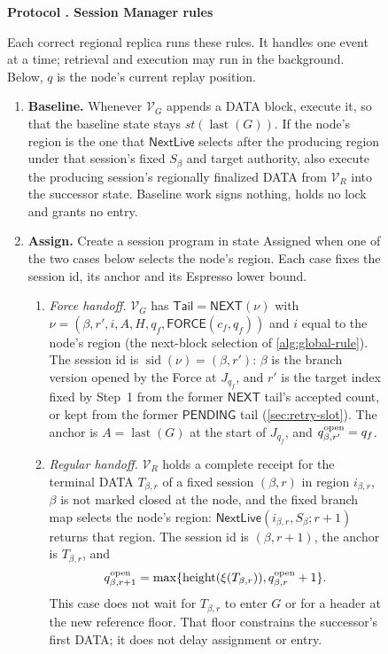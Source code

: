\documentclass[11pt,a4paper]{article}
\newcommand{\tagg}[1]{\ensuremath{\mathsf{#1}}}
\newcounter{protocol}
\newenvironment{protocol}[3][htbp]{\begin{figure}[#1]\refstepcounter{protocol}\label{#2}
\begin{mdframed}[linewidth=.6pt,skipabove=0pt,skipbelow=0pt,
innertopmargin=7pt,innerbottommargin=7pt]\small
\textbf{Protocol \theprotocol. #3}\par\smallskip}{\end{mdframed}\end{figure}}
\begin{document}
\begin{protocol}[H]{alg:rotation}{Session Manager rules}
Each correct regional replica runs these rules. It handles one event at
a time; retrieval and execution may run in the background. Below, $q$
is the node's current replay position.
\begin{enumerate}[label=\textbf{\arabic*)},itemsep=3pt]
\item \textbf{Baseline.} Whenever $\mathcal V_G$ appends a DATA block,
execute it, so that the baseline state stays
$\mathit{st}(\operatorname{last}(G))$. If the node's region is the one
that $\tagg{NextLive}$ selects after the producing region under that
session's fixed $S_\beta$ and target authority,
also execute the producing session's regionally finalized DATA from
$\mathcal V_R$ into the successor state. Baseline work signs nothing,
holds no lock and grants no entry.
\item \textbf{Assign.} Create a session program in state Assigned when
one of the two cases below selects the node's region. Each case fixes
the session id, its anchor and its Espresso lower bound.
 \begin{enumerate}[label=(\alph*),itemsep=2pt]
 \item \emph{Force handoff.} $\mathcal V_G$ has
 $\mathsf{Tail}=\tagg{NEXT}(\nu)$ with
 $\nu=(\beta,r',i,A,H,q_f,\tagg{FORCE}(c_f,q_f))$ and $i$ equal to the
 node's region (the next-block selection of \cref{alg:global-rule}). The session id is
 $\operatorname{sid}(\nu)=(\beta,r')$: $\beta$ is the branch version
 opened by the Force at $J_{q_f}$, and $r'$ is the target index fixed by
 Step~1 from the former $\tagg{NEXT}$ tail's accepted count, or kept from
 the former $\tagg{PENDING}$ tail (\cref{sec:retry-slot}). The anchor is
 $A=\operatorname{last}(G)$ at the start of $J_{q_f}$, and
 $q^{\rm open}_{\beta,r'}=q_f$.
 \item \emph{Regular handoff.} $\mathcal V_R$ holds a complete receipt
 for the terminal DATA $T_{\beta,r}$ of a fixed session $(\beta,r)$ in
 region $i_{\beta,r}$, $\beta$ is not marked closed at the node, and the
 fixed branch map selects the node's region:
 $\tagg{NextLive}(i_{\beta,r},S_\beta;r+1)$ returns that region. The
 session id is
 $(\beta,r+1)$, the anchor is $T_{\beta,r}$, and
 \[
 q^{\rm open}_{\beta,r+1}=
 \max\{\operatorname{height}(\xi(T_{\beta,r})),
        q^{\rm open}_{\beta,r}+1\}.
 \]
 This case does not wait for $T_{\beta,r}$ to enter $G$ or for a header
 at the new reference floor. That floor constrains the successor's first
 DATA; it does not delay assignment or entry.

\end{enumerate}
\end{enumerate}
\end{protocol}
\end{document}
